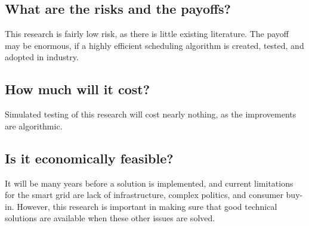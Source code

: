 \documentclass[9pt]{article}
\begin{document}
\subsection*{What are the risks and the payoffs?}
This research is fairly low risk, as there is little existing literature. The payoff may be enormous,
if a highly efficient scheduling algorithm is created, tested, and adopted in industry.
\subsection*{How much will it cost?}
Simulated testing of this research will cost nearly nothing, as the improvements are algorithmic.
\subsection*{Is it economically feasible?}
It will be many years before a solution is implemented, and current limitations for the smart grid are 
lack of infrastructure, complex politics, and consumer buy-in. However, this research is important
in making sure that good technical solutions are available when these other issues are solved.
\end{document}
